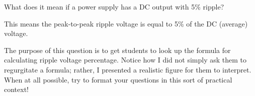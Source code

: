 

What does it mean if a power supply has a DC output with 5\% ripple?







This means the peak-to-peak ripple voltage is equal to 5\% of the DC (average) voltage.







The purpose of this question is to get students to look up the formula for calculating ripple voltage percentage.  Notice how I did not simply ask them to regurgitate a formula; rather, I presented a realistic figure for them to interpret.  When at all possible, try to format your questions in this sort of practical context!




